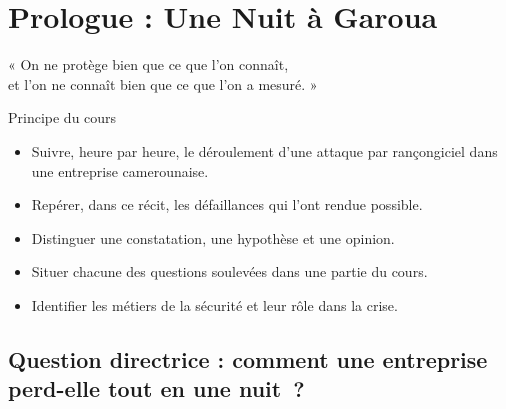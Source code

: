 
\chapter{Prologue : Une Nuit à Garoua}
\label{chap:prologue}

\epigraph{%
    « On ne protège bien que ce que l'on connaît,\\
    et l'on ne connaît bien que ce que l'on a mesuré. »%
}{Principe du cours}


\begin{boxobjectifs}
\begin{itemize}
    \item Suivre, heure par heure, le déroulement d'une attaque par
          rançongiciel dans une entreprise camerounaise.
    \item Repérer, dans ce récit, les défaillances qui l'ont rendue possible.
    \item Distinguer une constatation, une hypothèse et une opinion.
    \item Situer chacune des questions soulevées dans une partie du cours.
    \item Identifier les métiers de la sécurité et leur rôle dans la crise.
\end{itemize}
\end{boxobjectifs}

\bigskip

\section*{Question directrice : comment une entreprise perd-elle tout en une nuit~?}

